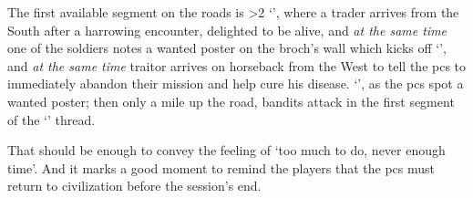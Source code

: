 \begin{multicols}{2}
The first available \gls{segment} on the roads is
\ifnum\value{cycle}>2%
  `', where a trader arrives from the South after a harrowing encounter, delighted to be alive, and \emph{at the same time} one of the \glspl{soldier} notes a wanted poster on the \gls{broch}'s wall which kicks off `', and \emph{at the same time} \gls{traitor} arrives on horseback from the West to tell the \glspl{pc} to immediately abandon their mission and help cure his disease.
\else
  `', as the \glspl{pc} spot a wanted poster; then only a mile up the road, bandits attack in the first \gls{segment} of the `' \gls{thread}.
\fi

That should be enough to convey the feeling of `too much to do, never enough time'.
And it marks a good moment to remind the players that the \glspl{pc} must return to civilization before the session's end.

\end{multicols}
